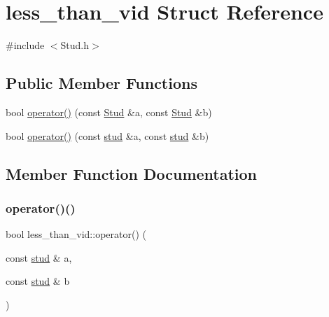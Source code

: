 \hypertarget{structless__than__vid}{}\section{less\+\_\+than\+\_\+vid Struct Reference}
\label{structless__than__vid}


{\ttfamily \#include $<$Stud.\+h$>$}

\subsection*{Public Member Functions}
\begin{DoxyCompactItemize}
\item 
bool \mbox{\hyperlink{structless__than__vid_adecd531ff9e48d74c53794b17cc056b0}{operator()}} (const \mbox{\hyperlink{class_stud}{Stud}} \&a, const \mbox{\hyperlink{class_stud}{Stud}} \&b)
\item 
bool \mbox{\hyperlink{structless__than__vid_a3cdca7faee502f444d79c587cc034e67}{operator()}} (const \mbox{\hyperlink{structstud}{stud}} \&a, const \mbox{\hyperlink{structstud}{stud}} \&b)
\end{DoxyCompactItemize}


\subsection{Member Function Documentation}
\mbox{\label{structless__than__vid_a3cdca7faee502f444d79c587cc034e67}} 
\subsubsection{\texorpdfstring{operator()()}{operator()()}\hspace{0.1cm}{\footnotesize\ttfamily [1/2]}}
{\footnotesize\ttfamily bool less\+\_\+than\+\_\+vid\+::operator() (\begin{DoxyParamCaption}\item[{const \mbox{\hyperlink{structstud}{stud}} \&}]{a,  }\item[{const \mbox{\hyperlink{structstud}{stud}} \&}]{b }\end{DoxyParamCaption})\hspace{0.3cm}{\ttfamily [inline]}}

\mbox{\label{structless__than__vid_adecd531ff9e48d74c53794b17cc056b0}} 
